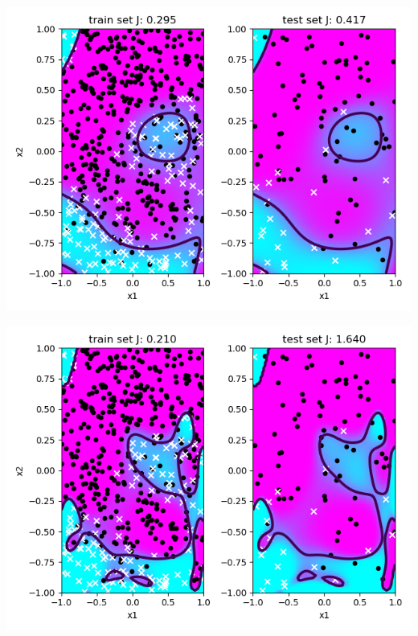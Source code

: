 \documentclass[a4paper]{article}
\begin{document}
\begin{enumerate}
\begin{minipage}[b]{0.4\textwidth}
 \captionsetup{justification=centering}
  \label{scipy_gradient_descent_2_1_1000}
\end{minipage}
\begin{minipage}[b]{0.4\textwidth}
  \includegraphics[scale=0.35]{plots/scipy_gradient_descent_5_1_1000.png}
 \captionsetup{justification=centering}
  \label{scipy_gradient_descent_5_1_1000}
\end{minipage}
\hfill
\begin{minipage}[b]{0.4\textwidth}
  \includegraphics[scale=0.35]{plots/scipy_gradient_descent_15_1_1000.png}
 \captionsetup{justification=centering}

\end{minipage}
\end{enumerate}
\end{document}
